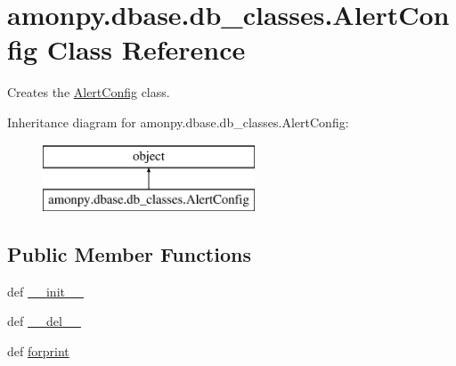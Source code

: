 \hypertarget{classamonpy_1_1dbase_1_1db__classes_1_1_alert_config}{\section{amonpy.\-dbase.\-db\-\_\-classes.\-Alert\-Config Class Reference}
\label{classamonpy_1_1dbase_1_1db__classes_1_1_alert_config}
}


Creates the \hyperlink{classamonpy_1_1dbase_1_1db__classes_1_1_alert_config}{Alert\-Config} class.  


Inheritance diagram for amonpy.\-dbase.\-db\-\_\-classes.\-Alert\-Config\-:\begin{figure}[H]
\begin{center}
\leavevmode
\includegraphics[height=2.000000cm]{d1/d62/classamonpy_1_1dbase_1_1db__classes_1_1_alert_config}
\end{center}
\end{figure}
\subsection*{Public Member Functions}
\begin{DoxyCompactItemize}
\item 
def \hyperlink{classamonpy_1_1dbase_1_1db__classes_1_1_alert_config_ac579b972a4ff6bbd4770a04df3bcb744}{\-\_\-\-\_\-init\-\_\-\-\_\-}
\item 
def \hyperlink{classamonpy_1_1dbase_1_1db__classes_1_1_alert_config_a0b505c28e0b2083d929998465a3d205c}{\-\_\-\-\_\-del\-\_\-\-\_\-}
\item 
def \hyperlink{classamonpy_1_1dbase_1_1db__classes_1_1_alert_config_a4199bb054162725442056137dac9c760}{forprint}
\end{DoxyCompactItemize}
